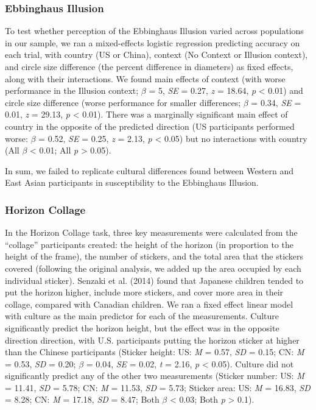 \documentclass[
  man,floatsintext]{apa6}
\begin{document}
\hypertarget{ebbinghaus-illusion-1}{%
\subsubsection{Ebbinghaus Illusion}\label{ebbinghaus-illusion-1}}

To test whether perception of the Ebbinghaus Illusion varied across populations in our sample, we ran a mixed-effects logistic regression predicting accuracy on each trial, with country (US or China), context (No Context or Illusion context), and circle size difference (the percent difference in diameters) as fixed effects, along with their interactions. We found main effects of context (with worse performance in the Illusion context; \(\beta\) = 5, \emph{SE} = 0.27, \emph{z} = 18.64, \emph{p} \textless{} 0.01) and circle size difference (worse performance for smaller differences; \(\beta\) = 0.34, \emph{SE} = 0.01, \emph{z} = 29.13, \emph{p} \textless{} 0.01). There was a marginally significant main effect of country in the opposite of the predicted direction (US participants performed worse: \(\beta\) = 0.52, \emph{SE} = 0.25, \emph{z} = 2.13, \emph{p} \textless{} 0.05) but no interactions with country (All \(\beta\) \textless{} 0.01; All \emph{p} \textgreater{} 0.05).

In sum, we failed to replicate cultural differences found between Western and East Asian participants in susceptibility to the Ebbinghaus Illusion.

\hypertarget{horizon-collage-1}{%
\subsubsection{Horizon Collage}\label{horizon-collage-1}}

In the Horizon Collage task, three key measurements were calculated from the ``collage'' participants created: the height of the horizon (in proportion to the height of the frame), the number of stickers, and the total area that the stickers covered (following the original analysis, we added up the area occupied by each individual sticker). Senzaki et al. (2014) found that Japanese children tended to put the horizon higher, include more stickers, and cover more area in their collage, compared with Canadian children. We ran a fixed effect linear model with culture as the main predictor for each of the measurements. Culture significantly predict the horizon height, but the effect was in the opposite direction direction, with U.S. participants putting the horizon sticker at higher than the Chinese participants (Sticker height: US: \emph{M} = 0.57, \emph{SD} = 0.15; CN: \emph{M} = 0.53, \emph{SD} = 0.20; \(\beta\) = 0.04, \emph{SE} = 0.02, \emph{t} = 2.16, \emph{p} \textless{} 0.05). Culture did not significantly predict any of the other two measurements (Sticker number: US: \emph{M} = 11.41, \emph{SD} = 5.78; CN: \emph{M} = 11.53, \emph{SD} = 5.73; Sticker area: US: \emph{M} = 16.83, \emph{SD} = 8.28; CN: \emph{M} = 17.18, \emph{SD} = 8.47; Both \(\beta\) \textless{} 0.03; Both \emph{p} \textgreater{} 0.1).
\end{document}
